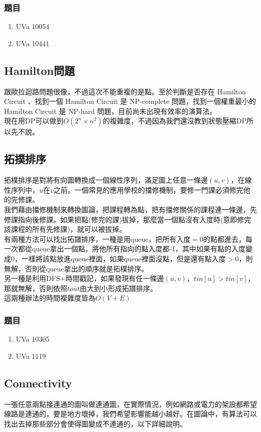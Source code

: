 \subsubsection{題目}
\begin{enumerate}
\item UVa 10054
\item UVa 10441
\end{enumerate}
\subsection{Hamilton問題}
跟歐拉迴路問題很像，不過這次不能重複的是點。至於判斷是否存在 Hamilton Circuit 、找到一個 Hamilton Circuit 是 NP-complete 問題，找到一個權重最小的 Hamilton Circuit 是 NP-hard 問題，目前尚未出現有效率的演算法。\\
現在用DP可以做到$O(2^n\times n^2)$的複雜度，不過因為我們還沒教到狀態壓縮DP所以先不說。
\subsection{拓撲排序}
拓樸排序是對將有向圖轉換成一個線性序列，滿足圖上任意一條邊$(u,v)$，在線性序列中，$u$在$v$之前。一個常見的應用學校的擋修機制，要修一門課必須修完他的先修課。\\
我們藉由擋修機制來轉換圖論，把課程轉為點，把有擋修關係的課程連一條邊，先修課指向後修課。如果把點(修完的課)拔掉，那麼當一個點沒有入度時(意即修完該課程的所有先修課)，就可以被拔掉。\\
有兩種方法可以找出拓譜排序，一種是用queue，把所有入度$=0$的點都進去，每一次都從queue拿出一個點，將他所有指向的點入度都-1，其中如果有點的入度變成0，一樣將該點放進queue裡面，如果queue裡面沒點，但是還有點入度$>0$，則無解，否則從queue拿出的順序就是拓樸排序。\\

另一種是利用DFS+時間戳記，如果發現有任一條邊$(u,v)$，$tin[u]>tin[v]$，那就無解，否則依照$tout$由大到小形成拓譜排序。\\
這兩種辦法的時間複雜度皆為$O(V+E)$
\subsubsection{題目}
\begin{enumerate}
\item UVa 10305
\item UVa 1119
\end{enumerate}
\subsection{Connectivity}
一張任意兩點接連通的圖叫做連通圖，在實際情況，例如網路或電力的架設都希望線路是連通的，要是地方壞掉，我們希望影響能越小越好。在圖論中，有算法可以找出去掉那些部分會使得圖變成不連通的，以下詳細說明。
